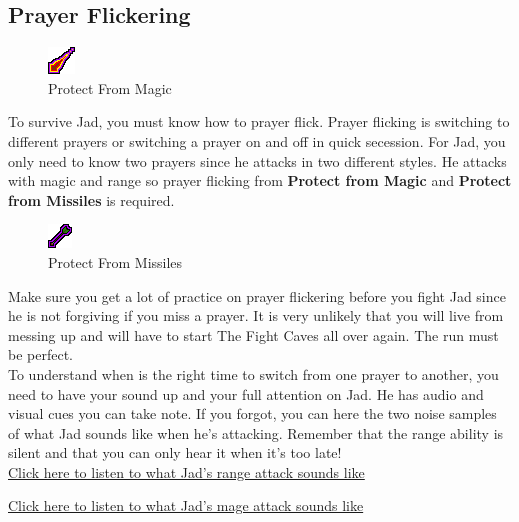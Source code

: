 \documentclass{article}
\begin{document}
\subsection{Prayer Flickering}
\begin{figure}
\includegraphics[width=.1\textwidth]{protectmage.png}
\small \caption*{Protect From Magic}
\end{figure}
\par To survive Jad, you must know how to prayer flick. 
Prayer flicking is switching to different prayers or switching a prayer on and off in quick secession. For Jad, you only need to know two prayers since he attacks in two different styles.  He attacks with magic and range so prayer flicking from \textbf{Protect from Magic} and \textbf{Protect from Missiles} is required.

\begin{figure}
\includegraphics[width=.1\textwidth]{protectrange.png}
\small \caption*{Protect From Missiles}
\end{figure}
Make sure you get a lot of practice on prayer flickering before you fight Jad since he is not forgiving if you miss a prayer. It is very unlikely that you will live from messing up and will have to start The Fight Caves all over again. The run must be perfect. 
\\To understand when is the right time to switch from one prayer to another, you need to have your sound up and your full attention on Jad. He has audio and visual cues you can take note. If you forgot, you can here the two noise samples of what Jad sounds like when he's attacking. Remember that the range ability is silent and that you can only hear it when it's too late!
\\\vspace{4mm}
\centering
\href{https://oldschool.runescape.wiki/index.php?title=File\%3ATzTok-Jad_Ranged_attack.ogg}
    {Click here to listen to what Jad's range attack sounds like}

    \vspace{2mm}
\href{https://oldschool.runescape.wiki/index.php?title=File\%3ATzTok-Jad_Magic_attack.ogg}
    {Click here to listen to what Jad's mage attack sounds like}
\newpage
\end{document}
